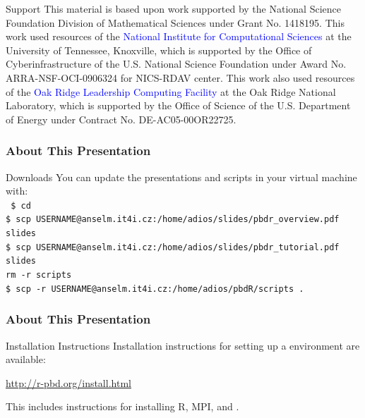 \begin{frame}[noframenumbering]
\begin{block}{Support}\tiny
  This material is based upon work supported by the National Science
  Foundation Division of Mathematical Sciences under Grant No. 1418195.
  This work used resources of the \textcolor{blue}{National Institute for
  Computational Sciences} at the University of Tennessee, Knoxville,
  which is supported by the Office of Cyberinfrastructure of the
  U.S. National Science Foundation under Award  No. ARRA-NSF-OCI-0906324
  for NICS-RDAV center.
  This work also used resources of the \textcolor{blue}{Oak Ridge
  Leadership Computing Facility} at the Oak Ridge National
  Laboratory, which is supported by the Office of Science of the
  U.S. Department of Energy under Contract No. DE-AC05-00OR22725.\\[.2cm]
\end{block}
\end{frame}

\begin{frame}
  \frametitle{About This Presentation}
  \begin{block}{Downloads}\scriptsize
    You can update the \pbdR presentations and scripts in your virtual
    machine with: \\ \tt
    \$ cd \\
    \$ scp USERNAME@anselm.it4i.cz:/home/adios/slides/pbdr\_overview.pdf slides \\
    \$ scp
    USERNAME@anselm.it4i.cz:/home/adios/slides/pbdr\_tutorial.pdf
    slides \\
    rm -r scripts \\
    \$ scp -r USERNAME@anselm.it4i.cz:/home/adios/pbdR/scripts .
 \end{block}
\end{frame}



\begin{frame}
\frametitle{About This Presentation}
 \begin{block}{Installation Instructions}
  Installation instructions for setting up a \pbdR environment are available:
  \begin{center}
  \url{http://r-pbd.org/install.html}
  \end{center}
  This includes instructions for installing R, MPI, and \pbdR.
 \end{block}
\end{frame}

